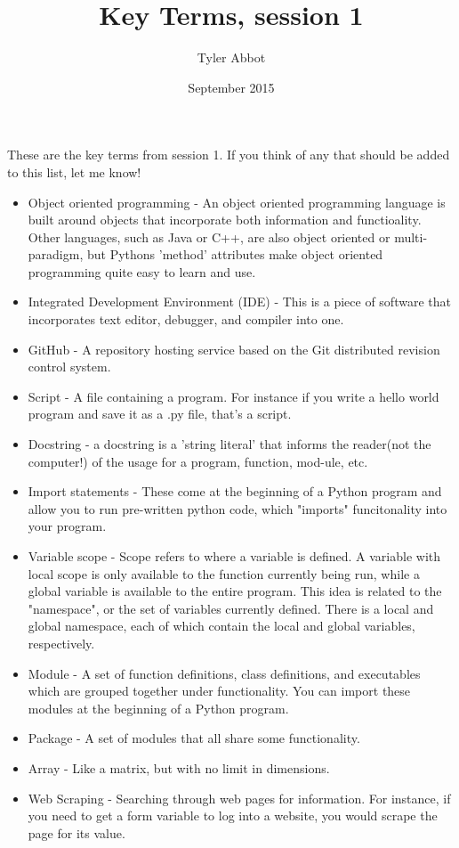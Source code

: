 \documentclass{article}
\title{Key Terms, session 1}
\author{Tyler Abbot}
\date{September 2015}
\begin{document}
\maketitle
These are the key terms from session 1.  If you think of any that should be added to this list, let me know!

\begin{itemize}
\item Object oriented programming - An object oriented programming language is built around objects that incorporate both information and functioality.  Other languages, such as Java or C++, are also object oriented or multi-paradigm, but Pythons 'method' attributes make object oriented programming quite easy to learn and use.

\item Integrated Development Environment (IDE) - This is a piece of software that incorporates text editor, debugger, and compiler into one.

\item GitHub - A repository hosting service based on the Git distributed revision control system.  

\item Script - A file containing a program.  For instance if you write a hello world program and save it as a .py file, that's a script.

\item Docstring - a docstring is a 'string literal' that informs the reader(not the computer!)  of the usage for a program, function, mod-ule,  etc. 

\item Import statements - These come at the beginning of a Python program and allow you to run pre-written python code, which "imports" funcitonality into your program.

\item Variable scope - Scope refers to where a variable is defined.  A variable with local scope is only available to the function currently being run, while a global variable is available to the entire program.  This idea is related to the "namespace", or the set of variables currently defined.  There is a local and global namespace, each of which contain the local and global variables, respectively.

\item Module - A set of function definitions, class definitions, and executables which are grouped together under functionality.  You can import these modules at the beginning of a Python program.

\item Package - A set of modules that all share some functionality.

\item Array - Like a matrix, but with no limit in dimensions.

\item Web Scraping - Searching through web pages for information.  For instance, if you need to get a form variable to log into a website, you would scrape the page for its value.

\end{itemize}
\end{document}
